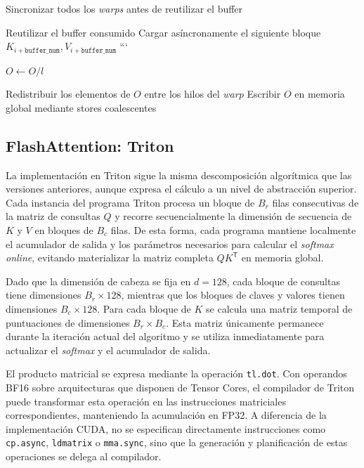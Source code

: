 \begin{algorithm}[H]
\begin{algorithmic}[1]
\State Sincronizar todos los \textit{warps} antes de reutilizar el buffer

    \State Reutilizar el buffer consumido
    \State Cargar asíncronamente el siguiente bloque \(K_{i+\texttt{buffer\_num}},V_{i+\texttt{buffer\_num}}\)
\EndIf
```

\EndFor

\State \(O \gets O/l\)

\State Redistribuir los elementos de \(O\) entre los hilos del \textit{warp}
\State Escribir \(O\) en memoria global mediante stores coalescentes

\end{algorithmic}
\end{algorithm}

\subsection{FlashAttention: Triton}

La implementación en Triton sigue la misma descomposición algorítmica que las versiones anteriores, aunque expresa el cálculo a un nivel de abstracción superior. Cada instancia del programa Triton procesa un bloque de \(B_r\) filas consecutivas de la matriz de consultas \(Q\) y recorre secuencialmente la dimensión de secuencia de \(K\) y \(V\) en bloques de \(B_c\) filas. De esta forma, cada programa mantiene localmente el acumulador de salida y los parámetros necesarios para calcular el \textit{softmax online}, evitando materializar la matriz completa \(QK^\mathsf{T}\) en memoria global.

Dado que la dimensión de cabeza se fija en \(d=128\), cada bloque de consultas tiene dimensiones \(B_r\times128\), mientras que los bloques de claves y valores tienen dimensiones \(B_c\times128\). Para cada bloque de \(K\) se calcula una matriz temporal de puntuaciones de dimensiones \(B_r\times B_c\). Esta matriz únicamente permanece durante la iteración actual del algoritmo y se utiliza inmediatamente para actualizar el \textit{softmax} y el acumulador de salida.

El producto matricial se expresa mediante la operación \texttt{tl.dot}. Con operandos BF16 sobre arquitecturas que disponen de Tensor Cores, el compilador de Triton puede transformar esta operación en las instrucciones matriciales correspondientes, manteniendo la acumulación en FP32. A diferencia de la implementación CUDA, no se especifican directamente instrucciones como \texttt{cp.async}, \texttt{ldmatrix} o \texttt{mma.sync}, sino que la generación y planificación de estas operaciones se delega al compilador.

